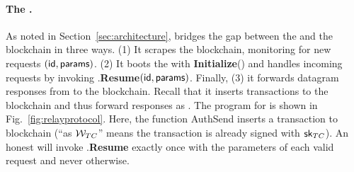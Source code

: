 \paragraph{The \medname \relay.}
As noted in Section~\ref{sec:architecture},
\relay bridges the gap between the \encname and the blockchain in three ways.
(1) It scrapes the blockchain, monitoring \tcont for new requests $({\sf id}, {\sf params})$.
(2) It boots the \engine with {\bf Initialize}() and handles incoming requests by invoking \engine.{\bf Resume}$({\sf id}, {\sf params})$.
Finally, (3) it forwards datagram responses from \engine to the blockchain.
Recall that it inserts transactions to the blockchain and thus forward responses as \tcadd.
The program for \relay is shown in Fig.~\ref{fig:relayprotocol}.
Here, the function {\sf AuthSend} inserts a transaction to blockchain (``as ${\cal W}_{TC}$'' means the transaction is already signed with ${\sf sk}_{TC}$).
An honest \medname will invoke \engine.{\bf Resume} exactly once with the parameters of each valid request and never otherwise.

